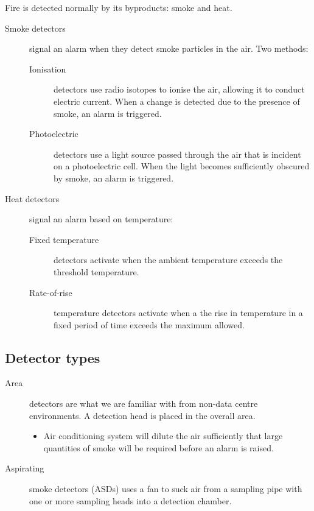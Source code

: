 \documentclass{pgnotes}
\begin{document}
Fire is detected normally by its byproducts: smoke and heat.

\begin{description}
\item[Smoke detectors]
signal an alarm when they detect smoke particles in the air. Two
methods:

\begin{description}
\item[Ionisation]
detectors use radio isotopes to ionise the air, allowing it to conduct
electric current. When a change is detected due to the presence of
smoke, an alarm is triggered.
\item[Photoelectric]
detectors use a light source passed through the air that is incident on
a photoelectric cell. When the light becomes sufficiently obscured by
smoke, an alarm is triggered.
\end{description}
\item[Heat detectors]
signal an alarm based on temperature:

\begin{description}
\item[Fixed temperature]
detectors activate when the ambient temperature exceeds the threshold
temperature.
\item[Rate-of-rise]
temperature detectors activate when a the rise in temperature in a fixed
period of time exceeds the maximum allowed.
\end{description}
\end{description}

\subsection{Detector types}
\label{sec:detector-types}

\begin{description}
\item[Area]
detectors are what we are familiar with from non-data centre
environments. A detection head is placed in the overall area.

\begin{itemize}
\item
  Air conditioning system will dilute the air sufficiently that large
  quantities of smoke will be required before an alarm is raised.
\end{itemize}
\item[Aspirating]
smoke detectors (ASDs) uses a fan to suck air from a sampling pipe with
one or more sampling heads into a detection chamber.
\end{description}
\end{document}

